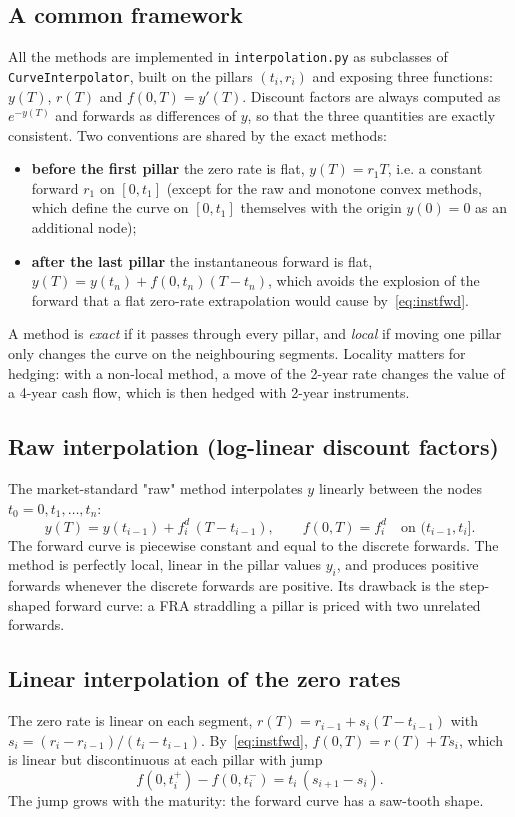 \documentclass[11pt,a4paper]{article}
\theoremstyle{plain}
\theoremstyle{definition}
\begin{document}
\subsection{A common framework}
All the methods are implemented in \texttt{interpolation.py} as subclasses of \texttt{CurveInterpolator}, built on the pillars $(t_i,r_i)$ and exposing three functions: $y(T)$, $r(T)$ and $f(0,T)=y'(T)$. Discount factors are always computed as $e^{-y(T)}$ and forwards as differences of $y$, so that the three quantities are exactly consistent. Two conventions are shared by the exact methods:
\begin{itemize}
    \item \textbf{before the first pillar} the zero rate is flat, $y(T)=r_1T$, i.e. a constant forward $r_1$ on $[0,t_1]$ (except for the raw and monotone convex methods, which define the curve on $[0,t_1]$ themselves with the origin $y(0)=0$ as an additional node);
    \item \textbf{after the last pillar} the instantaneous forward is flat, $y(T)=y(t_n)+f(0,t_n)(T-t_n)$, which avoids the explosion of the forward that a flat zero-rate extrapolation would cause by~\eqref{eq:instfwd}.
\end{itemize}
A method is \emph{exact} if it passes through every pillar, and \emph{local} if moving one pillar only changes the curve on the neighbouring segments. Locality matters for hedging: with a non-local method, a move of the 2-year rate changes the value of a 4-year cash flow, which is then hedged with 2-year instruments.

\subsection{Raw interpolation (log-linear discount factors)}
The market-standard "raw" method interpolates $y$ linearly between the nodes $t_0=0,t_1,\dots,t_n$:
\begin{equation}
    y(T)=y(t_{i-1})+f^d_i\,(T-t_{i-1}),\qquad f(0,T)=f^d_i\quad\text{on }(t_{i-1},t_i].
\end{equation}
The forward curve is piecewise constant and equal to the discrete forwards. The method is perfectly local, linear in the pillar values $y_i$, and produces positive forwards whenever the discrete forwards are positive. Its drawback is the step-shaped forward curve: a FRA straddling a pillar is priced with two unrelated forwards.

\subsection{Linear interpolation of the zero rates}
The zero rate is linear on each segment, $r(T)=r_{i-1}+s_i(T-t_{i-1})$ with $s_i=(r_i-r_{i-1})/(t_i-t_{i-1})$. By~\eqref{eq:instfwd}, $f(0,T)=r(T)+Ts_i$, which is linear but discontinuous at each pillar with jump
\begin{equation}
    f(0,t_i^+)-f(0,t_i^-)=t_i\,(s_{i+1}-s_i).
\end{equation}
The jump grows with the maturity: the forward curve has a saw-tooth shape.
\end{document}
